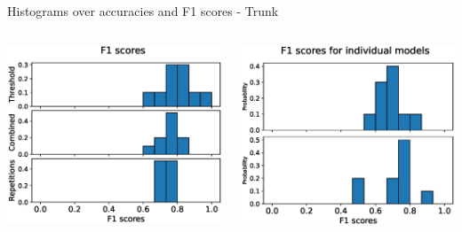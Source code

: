 \begin{frame}[fragile]{Histograms over accuracies and F1 scores - Trunk}
\begin{columns}
  \includegraphics[width=\textwidth]{files/figs/res/trunk/f1.eps}

  \includegraphics[width=\textwidth]{files/figs/res/trunk/f1-ind.eps}
\end{columns}
\end{frame}

